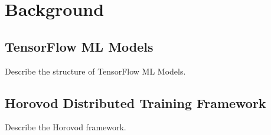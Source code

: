 \section{Background}\label{sec:background}
\subsection{TensorFlow ML Models}
Describe the structure of TensorFlow ML Models.

\subsection{Horovod Distributed Training Framework}
Describe the Horovod framework.
